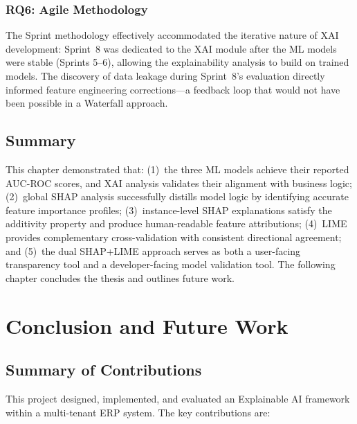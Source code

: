 \documentclass[12pt,a4paper]{report}
\begin{document}
\subsection{RQ6: Agile Methodology}

The Sprint methodology effectively accommodated the iterative nature of XAI development: Sprint~8 was dedicated to the XAI module after the ML models were stable (Sprints 5--6), allowing the explainability analysis to build on trained models. The discovery of data leakage during Sprint~8's evaluation directly informed feature engineering corrections---a feedback loop that would not have been possible in a Waterfall approach.

\section{Summary}
\label{sec:results_summary}

This chapter demonstrated that: (1)~the three ML models achieve their reported AUC-ROC scores, and XAI analysis validates their alignment with business logic; (2)~global SHAP analysis successfully distills model logic by identifying accurate feature importance profiles; (3)~instance-level SHAP explanations satisfy the additivity property and produce human-readable feature attributions; (4)~LIME provides complementary cross-validation with consistent directional agreement; and (5)~the dual SHAP+LIME approach serves as both a user-facing transparency tool and a developer-facing model validation tool. The following chapter concludes the thesis and outlines future work.


%
%
\chapter{Conclusion and Future Work}
\label{ch:conclusion}

\section{Summary of Contributions}
\label{sec:contributions}

This project designed, implemented, and evaluated an Explainable AI framework within a multi-tenant ERP system. The key contributions are:
\end{document}
